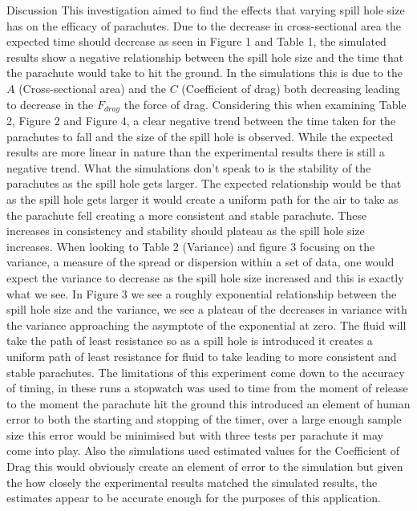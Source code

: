 \documentclass[final]{beamer}
\newlength{\colwidth}
\begin{document}
\begin{frame}[t]
\begin{columns}[t]
\begin{column}{\colwidth}
\begin{block}{Discussion}
This investigation aimed to find the effects that varying spill hole size has on the efficacy of parachutes. Due to the decrease in cross-sectional area the expected time should decrease as seen in Figure 1 and Table 1, the simulated results show a negative relationship between the spill hole size and the time that the parachute would take to hit the ground. In the simulations this is due to the $A$ (Cross-sectional area) and the $C$ (Coefficient of drag) both decreasing leading to decrease in the $F_{drag}$ the force of drag. Considering this when examining Table 2, Figure 2 and Figure 4, a clear negative trend between the time taken for the parachutes to fall and the size of the spill hole is observed. While the expected results are more linear in nature than the experimental results there is still a negative trend. What the simulations don't speak to is the stability of the parachutes as the spill hole gets larger. The expected relationship would be that as the spill hole gets larger it would create a uniform path for the air to take as the parachute fell creating a more consistent and stable parachute. These increases in consistency and stability should plateau as the spill hole size increases. When looking to Table 2 (Variance) and figure 3 focusing on the variance, a measure of the spread or dispersion within a set of data, one would expect the variance to decrease as the spill hole size increased and this is exactly what we see. In Figure 3 we see a roughly exponential relationship between the spill hole size and the variance, we see a plateau of the decreases in variance with the variance approaching the asymptote of the exponential at zero. The fluid will take the path of least resistance so as a spill hole is introduced it creates a uniform path of least resistance for fluid to take leading to more consistent and stable parachutes. The limitations of this experiment come down to the accuracy of timing, in these runs a stopwatch was used to time from the moment of release to the moment the parachute hit the ground this introduced an element of human error to both the starting and stopping of the timer, over a large enough sample size this error would be minimised but with three tests per parachute it may come into play. Also the simulations used estimated values for the Coefficient of Drag this would obviously create an element of error to the simulation but given the how closely the experimental results matched the simulated results, the estimates appear to be  accurate enough for the purposes of this application. 
 \end{block}


\end{column}
\end{columns}
\end{frame}
\end{document}
